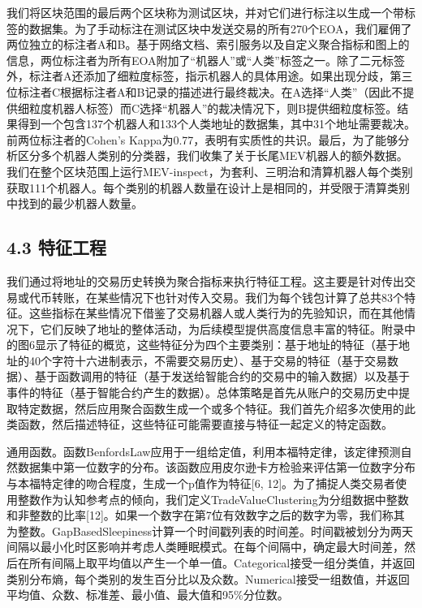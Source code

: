 我们将区块范围的最后两个区块称为测试区块，并对它们进行标注以生成一个带标签的数据集。为了手动标注在测试区块中发送交易的所有270个EOA，我们雇佣了两位独立的标注者A和B。基于网络文档、索引服务以及自定义聚合指标和图上的信息，两位标注者为所有EOA附加了“机器人”或“人类”标签之一。除了二元标签外，标注者A还添加了细粒度标签，指示机器人的具体用途。如果出现分歧，第三位标注者C根据标注者A和B记录的描述进行最终裁决。在A选择“人类”（因此不提供细粒度机器人标签）而C选择“机器人”的裁决情况下，则B提供细粒度标签。结果得到一个包含137个机器人和133个人类地址的数据集，其中31个地址需要裁决。前两位标注者的Cohen's Kappa为0.77，表明有实质性的共识。最后，为了能够分析区分多个机器人类别的分类器，我们收集了关于长尾MEV机器人的额外数据。我们在整个区块范围上运行MEV-inspect，为套利、三明治和清算机器人每个类别获取111个机器人。每个类别的机器人数量在设计上是相同的，并受限于清算类别中找到的最少机器人数量。

\subsection*{4.3 特征工程}

我们通过将地址的交易历史转换为聚合指标来执行特征工程。这主要是针对传出交易或代币转账，在某些情况下也针对传入交易。我们为每个钱包计算了总共83个特征。这些指标在某些情况下借鉴了交易机器人或人类行为的先验知识，而在其他情况下，它们反映了地址的整体活动，为后续模型提供高度信息丰富的特征。附录中的图6显示了特征的概览，这些特征分为四个主要类别：基于地址的特征（基于地址的40个字符十六进制表示，不需要交易历史）、基于交易的特征（基于交易数据）、基于函数调用的特征（基于发送给智能合约的交易中的输入数据）以及基于事件的特征（基于智能合约产生的数据）。总体策略是首先从账户的交易历史中提取特定数据，然后应用聚合函数生成一个或多个特征。我们首先介绍多次使用的此类函数，然后描述特征，这些特征可能需要直接与特征一起定义的特定函数。

通用函数。函数BenfordsLaw应用于一组给定值，利用本福特定律，该定律预测自然数据集中第一位数字的分布。该函数应用皮尔逊卡方检验来评估第一位数字分布与本福特定律的吻合程度，生成一个p值作为特征[6, 12]。为了捕捉人类交易者使用整数作为认知参考点的倾向，我们定义TradeValueClustering为分组数据中整数和非整数的比率[12]。如果一个数字在第7位有效数字之后的数字为零，我们称其为整数。GapBasedSleepiness计算一个时间戳列表的时间差。时间戳被划分为两天间隔以最小化时区影响并考虑人类睡眠模式。在每个间隔中，确定最大时间差，然后在所有间隔上取平均值以产生一个单一值。Categorical接受一组分类值，并返回类别分布熵，每个类别的发生百分比以及众数。Numerical接受一组数值，并返回平均值、众数、标准差、最小值、最大值和95\%分位数。

